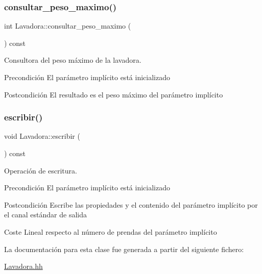 \subsubsection{\texorpdfstring{consultar\+\_\+peso\+\_\+maximo()}{consultar\_peso\_maximo()}}
{\footnotesize\ttfamily int Lavadora\+::consultar\+\_\+peso\+\_\+maximo (\begin{DoxyParamCaption}{ }\end{DoxyParamCaption}) const}



Consultora del peso máximo de la lavadora. 

\begin{DoxyPrecond}{Precondición}
El parámetro implícito está inicializado 
\end{DoxyPrecond}
\begin{DoxyPostcond}{Postcondición}
El resultado es el peso máximo del parámetro implícito 
\end{DoxyPostcond}
\mbox{\label{class_lavadora_a2372c33a5f76dda6e3892d118ae726f1}} 
\subsubsection{\texorpdfstring{escribir()}{escribir()}}
{\footnotesize\ttfamily void Lavadora\+::escribir (\begin{DoxyParamCaption}{ }\end{DoxyParamCaption}) const}



Operación de escritura. 

\begin{DoxyPrecond}{Precondición}
El parámetro implícito está inicializado 
\end{DoxyPrecond}
\begin{DoxyPostcond}{Postcondición}
Escribe las propiedades y el contenido del parámetro implícito por el canal estándar de salida 
\end{DoxyPostcond}
\begin{DoxyParagraph}{Coste Lineal respecto al número de prendas del parámetro implícito}

\end{DoxyParagraph}


La documentación para esta clase fue generada a partir del siguiente fichero\+:\begin{DoxyCompactItemize}
\item 
\mbox{\hyperlink{_lavadora_8hh}{Lavadora.\+hh}}\end{DoxyCompactItemize}
